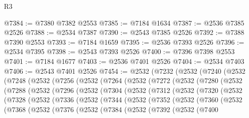 \begin{lexlean}{R3}
\begin{coremodule}
@7384 := @7380 @7382 @2553
@7385 := @7184 @1634
@7387 := @2536 @7385 @2526
@7388 := @2534 @7387
@7390 := @2543 @7385 @2526
@7392 := @7388 @7390 @2553
@7393 := @7184 @1659
@7395 := @2536 @7393 @2526
@7396 := @2534 @7395
@7398 := @2543 @7393 @2526
@7400 := @7396 @7398 @2553
@7401 := @7184 @1677
@7403 := @2536 @7401 @2526
@7404 := @2534 @7403
@7406 := @2543 @7401 @2526
@7454 := @2532
    (@7232
      (@2532
        (@7240
          (@2532
            (@7248
              (@2532
                (@7256
                  (@2532
                    (@7264
                      (@2532
                        (@7272
                          (@2532
                            (@7280
                              (@2532
                                (@7288
                                  (@2532
                                    (@7296
                                      (@2532
                                        (@7304
                                          (@2532
                                            (@7312
                                              (@2532
                                                (@7320
                                                  (@2532
                                                    (@7328
                                                      (@2532
                                                        (@7336
                                                          (@2532
                                                            (@7344
                                                              (@2532
                                                                (@7352
                                                                  (@2532
                                                                    (@7360
                                                                      (@2532
                                                                        (@7368
                                                                          (@2532
                                                                            (@7376
                                                                              (@2532
                                                                                (@7384
                                                                                  (@2532
                                                                                    (@7392
                                                                                      (@2532
                                                                                        (@7400

\end{coremodule}
\end{lexlean}
